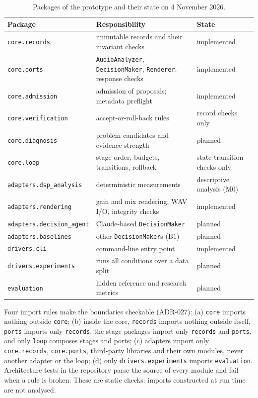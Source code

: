 \begin{table}[htb]
	\centering
	\small
	\begin{tabular}{@{}>{\raggedright\arraybackslash}p{}>{\raggedright\arraybackslash}p{}>{\raggedright\arraybackslash}p{}@{}}
		\toprule
		Package & Responsibility & State \\
		\midrule
		\texttt{core.records} & immutable records and their invariant checks & implemented \\
		\texttt{core.ports} & \texttt{AudioAnalyzer}, \texttt{DecisionMaker}, \texttt{Renderer}; response checks & implemented \\
		\texttt{core.admission} & admission of proposals; metadata preflight & implemented \\
		\texttt{core.verification} & accept-or-roll-back rules & record checks only \\
		\texttt{core.diagnosis} & problem candidates and evidence strength & planned \\
		\texttt{core.loop} & stage order, budgets, transitions, rollback & state-transition checks only \\
		\texttt{adapters.dsp\_analysis} & deterministic measurements & descriptive analysis (M0) \\
		\texttt{adapters.rendering} & gain and mix rendering, \ac{WAV} I/O, integrity checks & implemented \\
		\texttt{adapters.decision\_agent} & Claude-based \texttt{DecisionMaker} & planned \\
		\texttt{adapters.baselines} & other \texttt{DecisionMaker}s (B1) & planned \\
		\texttt{drivers.cli} & command-line entry point & implemented \\
		\texttt{drivers.experiments} & runs all conditions over a data split & planned \\
		\texttt{evaluation} & hidden reference and research metrics & planned \\
		\bottomrule
	\end{tabular}
	\caption{Packages of the prototype and their state on 4 November 2026.}
	\label{tab:arch-packages}
\end{table}


Four import rules make the boundaries checkable (ADR-027): (a) \texttt{core} imports nothing outside \texttt{core}; (b) inside the core, \texttt{records} imports nothing outside itself, \texttt{ports} imports only \texttt{records}, the stage packages import only \texttt{records} and \texttt{ports}, and only \texttt{loop} composes stages and ports; (c) adapters import only \texttt{core.records}, \texttt{core.ports}, third-party libraries and their own modules, never another adapter or the loop; (d) only \texttt{drivers.experiments} imports \texttt{evaluation}. Architecture tests in the repository parse the source of every module and fail when a rule is broken. These are static checks: imports constructed at run time are not analysed.

